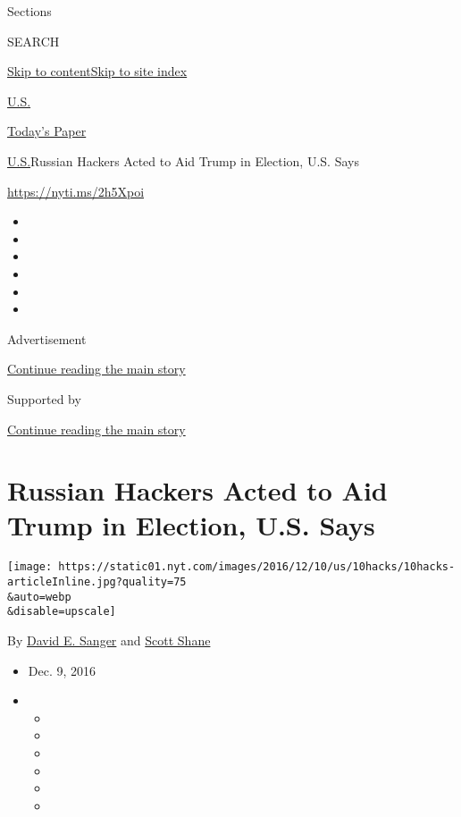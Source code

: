Sections

SEARCH

\protect\hyperlink{site-content}{Skip to
content}\protect\hyperlink{site-index}{Skip to site index}

\href{https://www.nytimes.com/section/us}{U.S.}

\href{https://myaccount.nytimes.com/auth/login?response_type=cookie\&client_id=vi}{}

\href{https://www.nytimes.com/section/todayspaper}{Today's Paper}

\href{/section/us}{U.S.}\textbar{}Russian Hackers Acted to Aid Trump in
Election, U.S. Says

\url{https://nyti.ms/2h5Xpoi}

\begin{itemize}
\item
\item
\item
\item
\item
\item
\end{itemize}

Advertisement

\protect\hyperlink{after-top}{Continue reading the main story}

Supported by

\protect\hyperlink{after-sponsor}{Continue reading the main story}

\hypertarget{russian-hackers-acted-to-aid-trump-in-election-us-says}{%
\section{Russian Hackers Acted to Aid Trump in Election, U.S.
Says}\label{russian-hackers-acted-to-aid-trump-in-election-us-says}}

\texttt{[image: https://static01.nyt.com/images/2016/12/10/us/10hacks/10hacks-articleInline.jpg?quality=75\\\&auto=webp\\\&disable=upscale]}

By \href{http://www.nytimes.com/by/david-e-sanger}{David E. Sanger} and
\href{http://www.nytimes.com/by/scott-shane}{Scott Shane}

\begin{itemize}
\item
  Dec. 9, 2016
\item
  \begin{itemize}
  \item
  \item
  \item
  \item
  \item
  \item
  \end{itemize}
\end{itemize}


